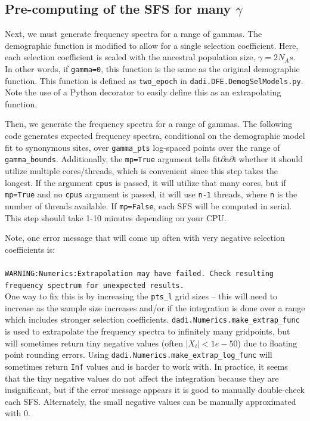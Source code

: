 \documentclass[12pt]{article}
\begin{document}
\subsection{Pre-computing of the SFS for many $\gamma$}

Next, we must generate frequency spectra for a range of gammas. The demographic function is modified to allow for a single selection coefficient. Here, each selection coefficient is scaled with the ancestral population size, $\gamma=2N_As$. In other words, if \texttt{gamma=0}, this function is the same as the original demographic function.
This function is defined as \texttt{two\_epoch} in \texttt{dadi.DFE.DemogSelModels.py}. Note the use of a Python decorator to easily define this as an extrapolating function.



Then, we generate the frequency spectra for a range of gammas. The following code generates expected frequency spectra, conditional on the demographic model fit to synonymous sites, over \texttt{gamma\_pts} log-spaced points over the range of \texttt{gamma\_bounds}. Additionally, the \texttt{mp=True} argument tells fit$\partial$a$\partial$i whether it should utilize multiple cores/threads, which is convenient since this step takes the longest. If the argument \texttt{cpus} is passed, it will utilize that many cores, but if \texttt{mp=True} and no \texttt{cpus} argument is passed, it will use \texttt{n-1} threads, where \texttt{n} is the number of threads available. If \texttt{mp=False}, each SFS will be computed in serial. This step should take 1-10 minutes depending on your CPU.



Note, one error message that will come up often with very negative selection coefficients is: \\ \\
\texttt{WARNING:Numerics:Extrapolation may have failed. Check resulting frequency spectrum for unexpected results.} \\

One way to fix this is by increasing the \texttt{pts\_l} grid sizes -- this will need to increase as the sample size increases and/or if the integration is done over a range which includes stronger selection coefficients. \texttt{dadi.Numerics.make\_extrap\_func} is used to extrapolate the frequency spectra to infinitely many gridpoints, but will sometimes return tiny negative values (often $|X_i|<1e-50$) due to floating point rounding errors. Using \texttt{dadi.Numerics.make\_extrap\_log\_func} will sometimes return \texttt{Inf} values and is harder to work with. In practice, it seems that the tiny negative values do not affect the integration because they are insignificant, but if the error message appears it is good to manually double-check each SFS. Alternately, the small negative values can be manually approximated with 0. 
\end{document}
